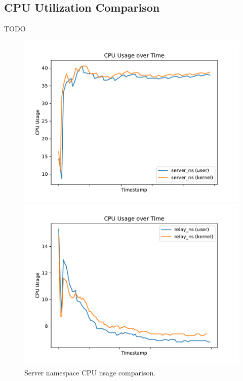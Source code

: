 \subsection{CPU Utilization Comparison}
TODO

\begin{figure}[!htb]
    \begin{minipage}{0.48\textwidth}
        \centering
        \includegraphics[width=1\linewidth]{figures/04_testing_and_results/cpu_usage_server_ns.pdf}
        \caption[Server CPU usage comparison]{Server namespace CPU usage comparison.}\label{fig:cpu-utilization-server}
    \end{minipage}\hfill
    \begin{minipage}{0.48\textwidth}
        \centering
        \includegraphics[width=1\linewidth]{figures/04_testing_and_results/cpu_usage_relay_ns.pdf}

\end{minipage}
\end{figure}
